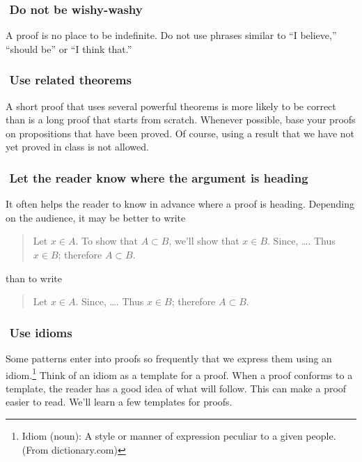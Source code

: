 \documentclass[12pt,fleqn]{article}
\newcounter{ex}\setcounter{ex}{0}
\newcommand{\ex}{%
\hspace{-0.2in} \setcounter{ex}{\value{ex}+1}
\theex \,\,}
\newcounter{id}\setcounter{id}{0}
\newcounter{se}\setcounter{se}{0}
\begin{document}
\subsubsection*{\ex  Do not be wishy-washy}  

A proof is no place to be indefinite.  Do not use  phrases similar 
to ``I believe,'' ``should be'' or ``I think that.''





\subsubsection*{\ex  Use related theorems}  

A short proof that uses several powerful theorems is more likely to be
correct than is a long proof that starts from scratch.  Whenever
possible, base your proofs on propositions that have been proved.  Of
course, using a result that we have not yet proved in class is not
allowed.

\subsubsection*{\ex  Let the reader know where the argument is heading} 

It often helps the reader to know in advance where a proof is heading.
Depending on the audience, it may be better to write

\begin{quote}
  Let $x \in A$.  To show that $ A \subset B$, we'll show that
  $x \in B$. Since, \dots. Thus $x \in B$; therefore $A \subset B$.
\end{quote}
than to write
\begin{quote}
  Let $x \in A$.  Since, \dots. Thus $x \in B$; therefore $A \subset B$.
\end{quote}

\subsubsection*{\ex  Use idioms}

Some patterns enter into proofs so frequently that we express them
using an idiom.\footnote{Idiom (noun): A style or manner of expression
peculiar to a given people. (From dictionary.com)} Think of an idiom
as a template for a proof.  When a proof conforms to a template, the
reader has a good idea of what will follow.  This can make a proof easier to
read. We'll learn a few templates for proofs. 
\end{document}
